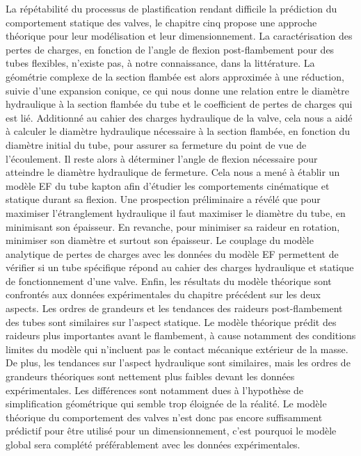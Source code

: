 La répétabilité du processus de plastification rendant difficile la prédiction du comportement statique des valves, le chapitre cinq propose une approche théorique pour leur modélisation et leur dimensionnement. La caractérisation des pertes de charges, en fonction de l'angle de flexion post-flambement pour des tubes flexibles, n'existe pas, à notre connaissance, dans la littérature. La géométrie complexe de la section flambée est alors approximée à une réduction, suivie d'une expansion conique, ce qui nous donne une relation entre le diamètre hydraulique à la section flambée du tube et le coefficient de pertes de charges qui est lié. Additionné au cahier des charges hydraulique de la valve, cela nous a aidé à calculer le diamètre hydraulique nécessaire à la section flambée, en fonction du diamètre initial du tube, pour assurer sa fermeture du point de vue de l'écoulement. Il reste alors à déterminer l'angle de flexion nécessaire pour atteindre le diamètre hydraulique de fermeture. Cela nous a mené à établir un modèle EF du tube kapton afin d'étudier les comportements cinématique et statique durant sa flexion. Une prospection préliminaire a révélé que pour maximiser l'étranglement hydraulique il faut maximiser le diamètre du tube, en minimisant son épaisseur. En revanche, pour minimiser sa raideur en rotation, minimiser son diamètre et surtout son épaisseur. Le couplage du modèle analytique de pertes de charges avec les données du modèle EF permettent de vérifier si un tube spécifique répond au cahier des charges hydraulique et statique de fonctionnement d'une valve. Enfin, les résultats du modèle théorique sont confrontés aux données expérimentales du chapitre précédent sur les deux aspects. Les ordres de grandeurs et les tendances des raideurs post-flambement des tubes sont similaires sur l'aspect statique. Le modèle théorique prédit des raideurs plus importantes avant le flambement, à cause notamment des conditions limites du modèle qui n'incluent pas le contact mécanique extérieur de la masse. De plus, les tendances sur l'aspect hydraulique sont similaires, mais les ordres de grandeurs théoriques sont nettement plus faibles devant les données expérimentales. Les différences sont notamment dues à l'hypothèse de simplification géométrique qui semble trop éloignée de la réalité. Le modèle théorique du comportement des valves n'est donc pas encore suffisamment prédictif pour être utilisé pour un dimensionnement, c'est pourquoi le modèle global sera complété préférablement avec les données expérimentales.

